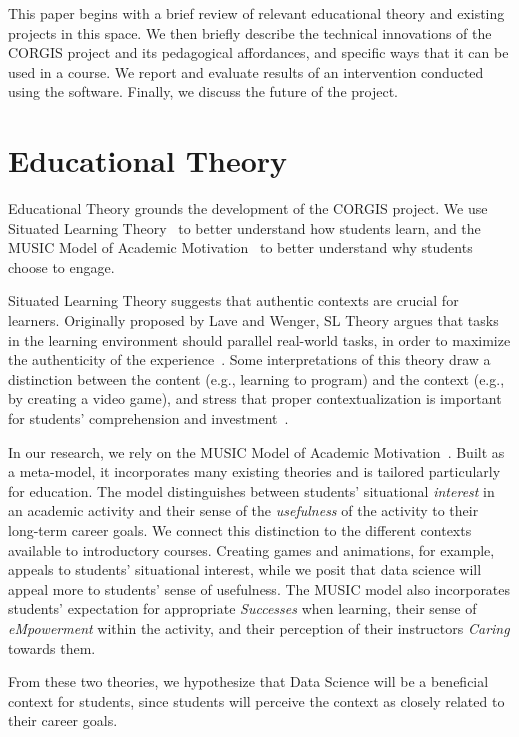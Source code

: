 \documentclass{sig-alternate}
\begin{document}
This paper begins with a brief review of relevant educational theory and existing projects in this space.
We then briefly describe the technical innovations of the CORGIS project and its pedagogical affordances, and specific ways that it can be used in a course.
We report and evaluate results of an intervention conducted using the software.
Finally, we discuss the future of the project.


\section{Educational Theory}

Educational Theory grounds the development of the CORGIS project.
We use Situated Learning Theory~\cite{lave-situated} to better understand how students learn, and the MUSIC Model of Academic Motivation~\cite{jones-description} to better understand why students choose to engage.

Situated Learning Theory suggests that authentic contexts are crucial for learners.
Originally proposed by Lave and Wenger, SL Theory argues that tasks in the learning environment should parallel real-world tasks, in order to maximize the authenticity of the experience~\cite{lave-situated}.
Some interpretations of this theory draw a distinction between the content (e.g., learning to program) and the context (e.g., by creating a video game), and stress that proper contextualization is important for students' comprehension and investment~\cite{situated-cognition}.

In our research, we rely on the MUSIC Model of Academic Motivation~\cite{jones-description}.
Built as a meta-model, it incorporates many existing theories and is tailored particularly for education.
The model distinguishes between students' situational \textit{interest} in an academic activity and their sense of the \textit{usefulness} of the activity to their long-term career goals.
We connect this distinction to the different contexts available to introductory courses.
Creating games and animations, for example, appeals to students' situational interest, while we posit that data science will appeal more to students' sense of usefulness.
The MUSIC model also incorporates students' expectation for appropriate \textit{Successes} when learning, their sense of \textit{eMpowerment} within the activity, and their perception of their instructors \textit{Caring} towards them.

From these two theories, we hypothesize that Data Science will be a beneficial context for students, since students will perceive the context as closely related to their career goals.
\end{document}
